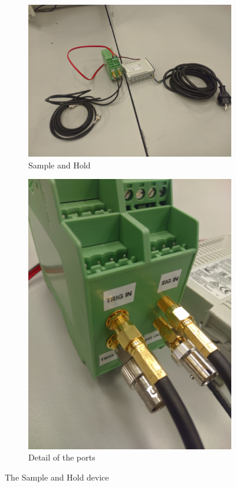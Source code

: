 \documentclass[a4paper, 10pt]{article}
\begin{document}
\begin{figure}[h]
    \centering
    \begin{subfigure}{0.4\textwidth}
        \includegraphics[width=\textwidth]{../images/sample-hold.jpg}
        \caption{Sample and Hold}
        \label{fig:sample-hold-overview}
    \end{subfigure}
    \begin{subfigure}{0.4\textwidth}
        \includegraphics[width=\textwidth]{../images/sample-hold-detail.jpg}
        \caption{Detail of the ports}
        \label{fig:sample-hold-detail}
    \end{subfigure}
    \caption{The Sample and Hold device}
    \label{fig:sample-hold}
\end{figure}
\end{document}
